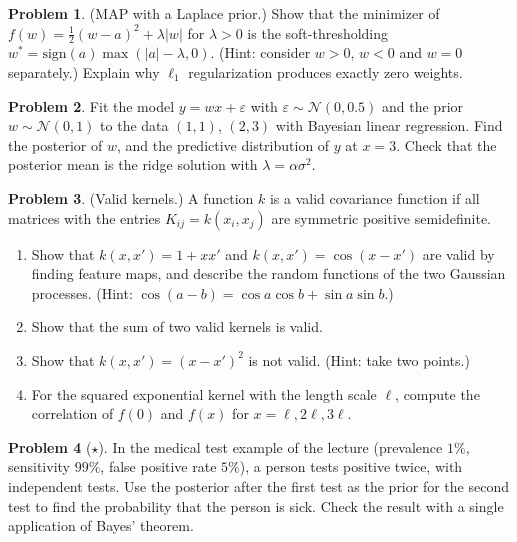 \documentclass[11pt]{article}
\theoremstyle{definition}
\newtheorem{problem}{Problem}[section]
\begin{document}
\begin{problem}\label{pr:soft-threshold}
    (MAP with a Laplace prior.) Show that the minimizer of $f(w) = \frac{1}{2}(w - a)^2 + \lambda|w|$ for $\lambda > 0$ is the soft-thresholding $w^* = \mathrm{sign}(a)\max(|a| - \lambda, 0)$. (Hint: consider $w > 0$, $w < 0$ and $w = 0$ separately.) Explain why $\ell_1$ regularization produces exactly zero weights.
\end{problem}

\begin{problem}\label{pr:blr-practice}
    Fit the model $y = wx + \varepsilon$ with $\varepsilon \sim \mathcal{N}(0, 0.5)$ and the prior $w \sim \mathcal{N}(0, 1)$ to the data $(1, 1)$, $(2, 3)$ with Bayesian linear regression. Find the posterior of $w$, and the predictive distribution of $y$ at $x = 3$. Check that the posterior mean is the ridge solution with $\lambda = \alpha\sigma^2$.
\end{problem}

\begin{problem}\label{pr:gp-kernels}
    (Valid kernels.) A function $k$ is a valid covariance function if all matrices with the entries $K_{ij} = k(x_i, x_j)$ are symmetric positive semidefinite.
    \begin{enumerate}[label=(\alph*)]
        \item Show that $k(x, x') = 1 + xx'$ and $k(x, x') = \cos(x - x')$ are valid by finding feature maps, and describe the random functions of the two Gaussian processes. (Hint: $\cos(a - b) = \cos a\cos b + \sin a\sin b$.)
        \item Show that the sum of two valid kernels is valid.
        \item Show that $k(x, x') = (x - x')^2$ is not valid. (Hint: take two points.)
        \item For the squared exponential kernel with the length scale $\ell$, compute the correlation of $f(0)$ and $f(x)$ for $x = \ell, 2\ell, 3\ell$.
    \end{enumerate}
\end{problem}

\begin{problem}[$\star$]\label{pr:two-tests}
    In the medical test example of the lecture (prevalence $1\%$, sensitivity $99\%$, false positive rate $5\%$), a person tests positive twice, with independent tests. Use the posterior after the first test as the prior for the second test to find the probability that the person is sick. Check the result with a single application of Bayes' theorem.
\end{problem}
\end{document}
